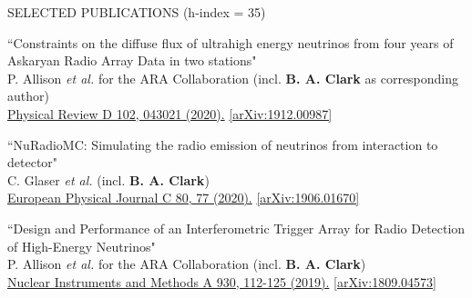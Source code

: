 \documentclass{resume} %
\begin{document}
\begin{rSection}{SELECTED PUBLICATIONS (h-index = 35)}
\begin{etaremune}
  \item ``Constraints on the diffuse flux of ultrahigh energy neutrinos from four years of Askaryan Radio Array Data in two stations" \\
 P. Allison {\it et al.} for the ARA Collaboration (incl. \textbf{B. A. Clark} as corresponding author)\\ \href{https://doi.org/10.1103/PhysRevD.102.043021}{Physical Review D 102, 043021 (2020).}  \href{https://arxiv.org/abs/1912.00987}{[arXiv:1912.00987]}



  \item ``NuRadioMC: Simulating the radio emission of neutrinos from interaction to detector" \\
 C. Glaser {\it et al.} (incl. \textbf{B. A. Clark})\\     \href{https://doi.org/10.1140/epjc/s10052-020-7612-8}{European Physical Journal C 80, 77 (2020).} \href{https://arxiv.org/abs/1906.01670}{[arXiv:1906.01670]}
 

  \item ``Design and Performance of an Interferometric Trigger Array for Radio Detection of High-Energy Neutrinos" \\
 P. Allison {\it et al.} for the ARA Collaboration (incl. \textbf{B. A. Clark}) \\    \href{https://doi.org/10.1016/j.nima.2019.01.067}{Nuclear Instruments and Methods A 930, 112-125 (2019).}  \href{https://arxiv.org/abs/1809.04573}{[arXiv:1809.04573]}
 


\end{etaremune}
\end{rSection}
\end{document}
